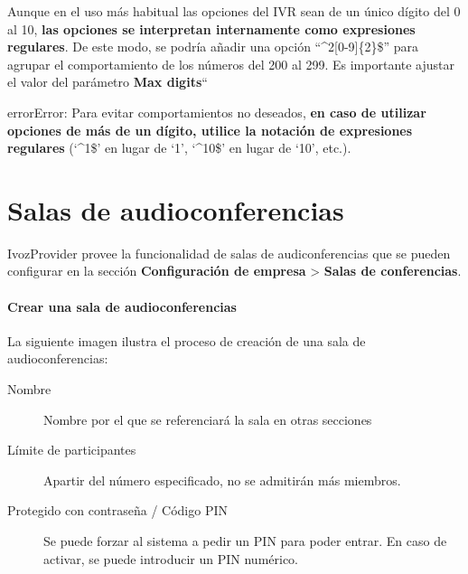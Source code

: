 \documentclass[letterpaper,10pt,spanish]{sphinxmanual}
\begin{document}
Aunque en el uso más habitual las opciones del IVR sean de un único dígito del 0 al 10, \textbf{las opciones se interpretan internamente como expresiones regulares}. De este modo, se podría añadir una opción ``\textasciicircum{}2{[}0-9{]}\{2\}\$'' para agrupar el comportamiento de los números del 200 al 299. Es importante ajustar el valor del parámetro \textbf{Max digits}``

\begin{notice}{error}{Error:}
Para evitar comportamientos no deseados, \textbf{en caso de utilizar opciones de más de un dígito, utilice la notación de expresiones regulares} (`\textasciicircum{}1\$' en lugar de `1', `\textasciicircum{}10\$' en lugar de `10', etc.).
\end{notice}


\section{Salas de audioconferencias}
\label{pbx_features/conference_rooms::doc}\label{pbx_features/conference_rooms:conference-rooms}\label{pbx_features/conference_rooms:id1}
IvozProvider provee la funcionalidad de salas de audiconferencias que se pueden configurar en la sección \textbf{Configuración de empresa} \textgreater{} \textbf{Salas de conferencias}.
\paragraph{Crear una sala de audioconferencias}

La siguiente imagen ilustra el proceso de creación de una sala de audioconferencias:

\noindent{}
\begin{description}
\item[{Nombre}] \leavevmode{}\label{pbx_features/conference_rooms:term-name}
Nombre por el que se referenciará la sala en otras secciones

\item[{Límite de participantes}] \leavevmode{}\label{pbx_features/conference_rooms:term-max-members}
Apartir del número especificado, no se admitirán más miembros.

\item[{Protegido con contraseña / Código PIN}] \leavevmode{}\label{pbx_features/conference_rooms:term-pin-protected}
Se puede forzar al sistema a pedir un PIN para poder entrar. En caso de activar, se puede introducir un PIN numérico.

\end{description}
\end{document}
